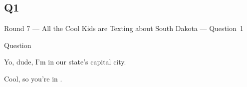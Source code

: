 \documentclass[11pt]{beamer}
\begin{document}
\subsection*{Q1}
\begin{frame}[t]{Round 7 --- All the Cool Kids are Texting about South Dakota --- \mbox{Question 1}}
\begin{block}{Question}

\begin{minipage}{0.9\textwidth}
\begin{mdframed}[
    roundcorner=7pt,
    backgroundcolor=black!5,
    linecolor=black!5,
    fontcolor=black,
    ignorelastdescenders]
\begin{flushleft}
{\small{}\selectfont{}
Yo, dude, I'm in our state's capital city.
}
\end{flushleft}
\end{mdframed}
\end{minipage}

\hfill{}\begin{minipage}{0.9\textwidth}
\begin{mdframed}[
    roundcorner=7pt,
    backgroundcolor=blue!80!white,
    linecolor=blue!80!white,
    fontcolor=white,
    ignorelastdescenders]
\begin{flushleft}
{\small{}\selectfont{}
Cool, so you're in \textunderscore{}\textunderscore{}\textunderscore{}\textunderscore{}\textunderscore{}\textunderscore{}.
}
\end{flushleft}
\end{mdframed}
\end{minipage}
\end{block}
\end{frame}
\end{document}
